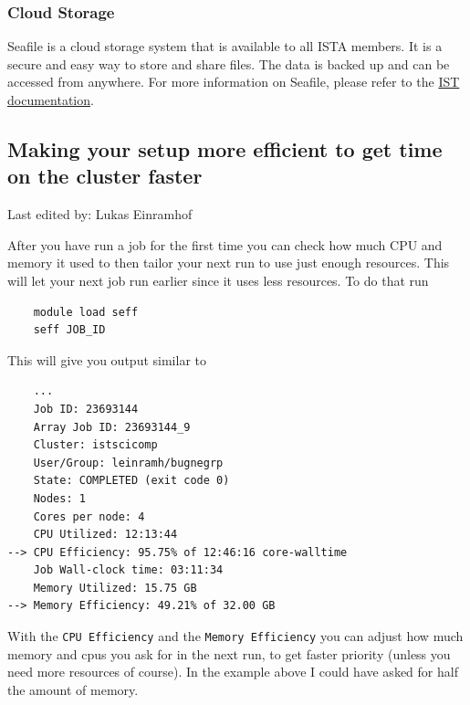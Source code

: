 \documentclass{article}
\newcommand{\setlasteditor}[1]{\gdef\lasteditor{#1}}
\newcommand{\lastedited}{%
    \vspace{1mm} {\footnotesize Last edited by: \lasteditor} \vspace{3mm}
    \newline

}
\begin{document}
\subsubsection{Cloud Storage}
Seafile is a cloud storage system that is available to all ISTA members. It is a secure and easy way to store and share files. The data is backed up and can be accessed from anywhere. For more information on Seafile, please refer to the \href{https://it.pages.ist.ac.at/how-to-safely-share-data/}{IST documentation}.

\subsection{Making your setup more efficient to get time on the cluster faster}
\setlasteditor{Lukas Einramhof}
\lastedited
\noindent
After you have run a job for the first time you can check how much CPU and memory it used to then tailor your next run to use just enough resources. This will let your next job run earlier since it uses less resources.
To do that run
\begin{verbatim}
    module load seff
    seff JOB_ID
\end{verbatim}
This will give you output similar to
\begin{verbatim}
    ...
    Job ID: 23693144
    Array Job ID: 23693144_9
    Cluster: istscicomp
    User/Group: leinramh/bugnegrp
    State: COMPLETED (exit code 0)
    Nodes: 1
    Cores per node: 4
    CPU Utilized: 12:13:44
--> CPU Efficiency: 95.75% of 12:46:16 core-walltime
    Job Wall-clock time: 03:11:34
    Memory Utilized: 15.75 GB
--> Memory Efficiency: 49.21% of 32.00 GB
\end{verbatim}
With the \texttt{CPU Efficiency} and the \texttt{Memory Efficiency} you can adjust how much memory and cpus you ask for in the next run, to get faster priority (unless you need more resources of course).
In the example above I could have asked for half the amount of memory.
\end{document}
